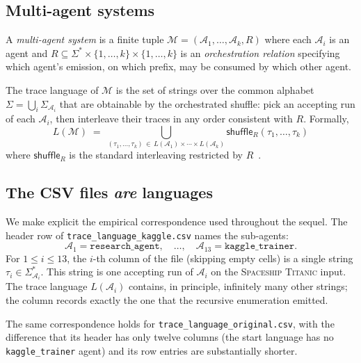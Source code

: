 \subsection{Multi-agent systems}

\begin{definition}
\label{def:multi}
A \emph{multi-agent system} is a finite tuple $\mathcal{M} =
(\mathcal{A}_1, \dots, \mathcal{A}_k, R)$ where each
$\mathcal{A}_i$ is an agent and $R \subseteq \Sigma^*\times\{1,
\dots,k\}\times\{1,\dots,k\}$ is an \emph{orchestration relation}
specifying which agent's emission, on which prefix, may be
consumed by which other agent.
\end{definition}

The trace language of $\mathcal{M}$ is the set of strings over the
common alphabet $\Sigma = \bigcup_i \Sigma_{\mathcal{A}_i}$ that
are obtainable by the orchestrated shuffle: pick an accepting run
of each $\mathcal{A}_i$, then interleave their traces in any order
consistent with $R$.  Formally,
\[
L(\mathcal{M}) \;=\;
\bigcup_{(\tau_1, \dots, \tau_k)\,\in\,
        L(\mathcal{A}_1)\times\cdots\times L(\mathcal{A}_k)}
\textsf{shuffle}_R(\tau_1, \dots, \tau_k)
\]
where $\textsf{shuffle}_R$ is the standard interleaving
restricted by $R$~\cite{hopcroft2006automata}.

\subsection{The CSV files \emph{are} languages}

We make explicit the empirical correspondence used throughout the
sequel.  The header row of \texttt{trace\_language\_kaggle.csv}
names the sub-agents:
\[
\mathcal{A}_1 = \texttt{research\_agent},\quad
\dots,\quad
\mathcal{A}_{13} = \texttt{kaggle\_trainer}.
\]
For $1\le i\le 13$, the $i$-th column of the file (skipping empty
cells) is a single string $\tau_i \in \Sigma_{\mathcal{A}_i}^*$.
This string is one accepting run of $\mathcal{A}_i$ on the
\textsc{Spaceship Titanic} input.  The trace language
$L(\mathcal{A}_i)$ contains, in principle, infinitely many other
strings; the column records exactly the one that the
recursive enumeration emitted.

The same correspondence holds for
\texttt{trace\_language\_original.csv}, with the difference that
its header has only twelve columns (the start language has no
\texttt{kaggle\_trainer} agent) and its row entries are
substantially shorter.

